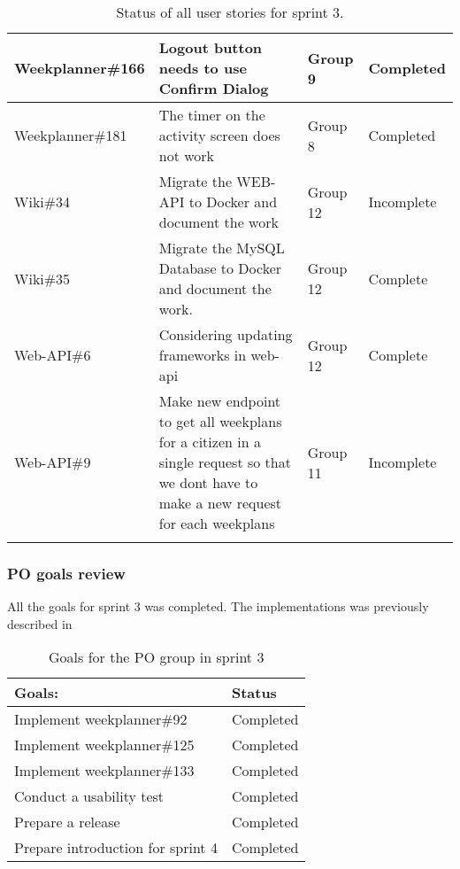 \begin{longtable}{|p{2.9cm}|p{8cm}|p{2cm}|p{2cm}|}
    Weekplanner\#166 & Logout button needs to use Confirm Dialog                                                                                                                                             & Group 9        & Completed     \\ \hline
    Weekplanner\#181 & The timer on the activity screen does not work                                                                                                                                         & Group 8       & Completed    \\ \hline
    Wiki\#34         & Migrate the WEB-API to Docker and document the work                                                                                                                                     & Group 12     & Incomplete    \\ \hline
    Wiki\#35         & Migrate the MySQL Database to Docker and document the work.                                                                                                                            & Group 12      & Complete   \\ \hline
    Web-API\#6      & Considering updating frameworks in web-api                                                                                                                                            & Group 12        & Complete    \\ \hline
    Web-API\#9      & Make new endpoint to get all weekplans for a citizen in a single request so that we dont have to make a new request for each weekplans                                                & Group 11        & Incomplete    \\ \hline
    \caption{Status of all user stories for sprint 3.}\label{table:sprint-3-review}
\end{longtable}


\subsubsection{PO goals review}
All the goals for sprint 3 was completed. 
The implementations was previously described in 
\begin{table}[H]
    \centering
    \begin{tabular}{|l|l|}
    \hline
    Goals:                            & Status        \\ \hline
    Implement weekplanner\#92         & Completed      \\ \hline
    Implement weekplanner\#125        & Completed      \\ \hline
    Implement weekplanner\#133        & Completed      \\ \hline
    Conduct a usability test          & Completed       \\ \hline
    Prepare a release                 & Completed         \\ \hline
    Prepare introduction for sprint 4 & Completed                        \\ \hline
    \end{tabular}
    \caption{Goals for the PO group in sprint 3}
    \label{PO-goal-sprint-3}
\end{table}
